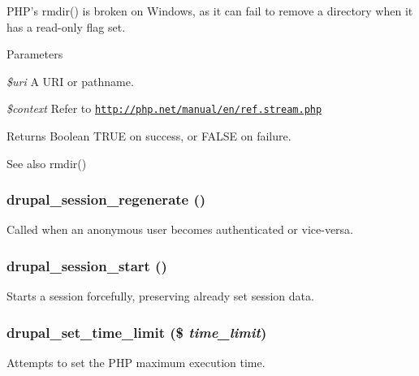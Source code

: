 PHP's rmdir() is broken on Windows, as it can fail to remove a directory when it has a read-\/only flag set.


\begin{DoxyParams}{Parameters}
\item[{\em \$uri}]A URI or pathname. \item[{\em \$context}]Refer to \href{http://php.net/manual/en/ref.stream.php}{\tt http://php.net/manual/en/ref.stream.php}\end{DoxyParams}
\begin{DoxyReturn}{Returns}
Boolean TRUE on success, or FALSE on failure.
\end{DoxyReturn}
\begin{DoxySeeAlso}{See also}
rmdir() 
\end{DoxySeeAlso}
\hypertarget{group__php__wrappers_ga144f983d31722d56cef8cdf259d2f68f}{
\subsubsection[{drupal\_\-session\_\-regenerate}]{\setlength{\rightskip}{0pt plus 5cm}drupal\_\-session\_\-regenerate ()}}
\label{group__php__wrappers_ga144f983d31722d56cef8cdf259d2f68f}
Called when an anonymous user becomes authenticated or vice-\/versa. \hypertarget{group__php__wrappers_gaef664546ab6308e639e0d6f6b363ae57}{
\subsubsection[{drupal\_\-session\_\-start}]{\setlength{\rightskip}{0pt plus 5cm}drupal\_\-session\_\-start ()}}
\label{group__php__wrappers_gaef664546ab6308e639e0d6f6b363ae57}
Starts a session forcefully, preserving already set session data. \hypertarget{group__php__wrappers_ga0507eefd9cd1db602b2184d0fae35097}{
\subsubsection[{drupal\_\-set\_\-time\_\-limit}]{\setlength{\rightskip}{0pt plus 5cm}drupal\_\-set\_\-time\_\-limit (\$ {\em time\_\-limit})}}
\label{group__php__wrappers_ga0507eefd9cd1db602b2184d0fae35097}
Attempts to set the PHP maximum execution time.

